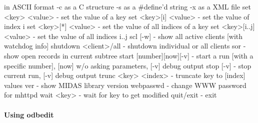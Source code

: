 \begin{DoxyCode}
                          in ASCII format
  -c                      as a C structure
  -s                      as a #define'd string
  -x                      as a XML file
set <key> <value>       - set the value of a key
set <key>[i] <value>    - set the value of index i
set <key>[*] <value>    - set the value of all indices of a key
set <key>[i..j] <value> - set the value of all indices i..j
scl [-w]                - show all active clients [with watchdog info]
shutdown <client>/all   - shutdown individual or all clients
sor                     - show open records in current subtree
start [number][now][-v] - start a run [with a specific number],
                          [now] w/o asking parameters, [-v] debug output
stop [-v]               - stop current run, [-v] debug output
trunc <key> <index>     - truncate key to [index] values
ver                     - show MIDAS library version
webpasswd               - change WWW password for mhttpd
wait <key>              - wait for key to get modified
quit/exit               - exit
\end{DoxyCode}


\par
 

\label{index_end}
\hypertarget{index_end}{}
 \paragraph{Using odbedit}\label{RC_odbedit_examples}
\label{RC_odbedit_examples_idx_odbedit-utility_examples}
\hypertarget{RC_odbedit_examples_idx_odbedit-utility_examples}{}
 \par
 


